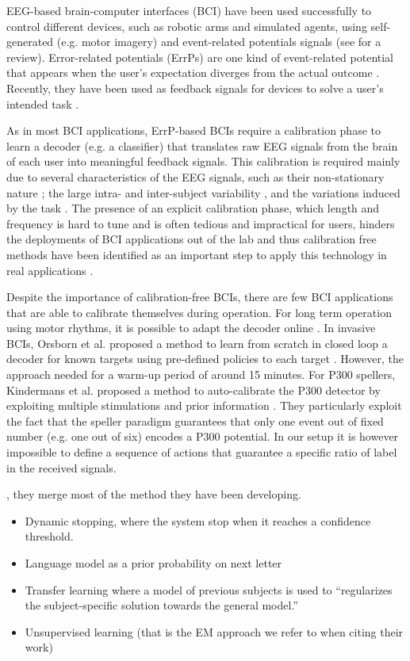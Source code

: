 EEG-based brain-computer interfaces (BCI) have been used successfully to control different devices, such as robotic arms and simulated agents, using self-generated (e.g. motor imagery) and event-related potentials signals (see \cite{millan10} for a review). 
%
Error-related potentials (ErrPs) are one kind of event-related potential that appears when the user's expectation diverges from the actual outcome \cite{Falkenstein00}. Recently, they have been used as feedback signals for devices to solve a user's intended task \cite{chavarriaga2010learning,iturrate13}.

As in most BCI applications, ErrP-based BCIs require a calibration phase to learn a decoder (e.g. a classifier) that translates raw EEG signals from the brain of each user into meaningful feedback signals. This calibration is required mainly due to several characteristics of the EEG signals, such as their non-stationary nature \cite{vidaurre11}; the large intra- and inter-subject variability \cite{Polich1997}, and the variations induced by the task \cite{iturrate2013task}. The presence of an explicit calibration phase, which length and frequency is hard to tune and is often tedious and impractical for users, hinders the deployments of BCI applications out of the lab and thus calibration free methods have been identified as an important step to apply this technology in real applications \cite{millan10}.

Despite the importance of calibration-free BCIs, there are few BCI applications that are able to calibrate themselves during operation. For long term operation using motor rhythms, it is possible to adapt the decoder online \cite{vidaurre2010towards}. In invasive BCIs, Orsborn et al. proposed a method to learn from scratch in closed loop a decoder for known targets using pre-defined policies to each target \cite{Orsborn2012}. However, the approach needed for a warm-up period of around 15 minutes. For P300 spellers, Kindermans et al. proposed a method to auto-calibrate the P300 detector by exploiting multiple stimulations and prior information \cite{Kindermans2012a,Kindermans2012b,tangermann2013zero}. They particularly exploit the fact that the speller paradigm guarantees that only one event out of fixed number (e.g. one out of six) encodes a P300 potential. In our setup it is however impossible to define a sequence of actions that guarantee a specific ratio of label in the received signals.


\cite{kindermans2014integrating}, they merge most of the method they have been developing.
\begin{itemize}
    \item Dynamic stopping, where the system stop when it reaches a confidence threshold.
    \item Language model as a prior probability on next letter
    \item Transfer learning where a model of previous subjects is used to ``regularizes the subject-specific solution towards the general model.''
    \item Unsupervised learning (that is the EM approach we refer to when citing their work)
\end{itemize}


